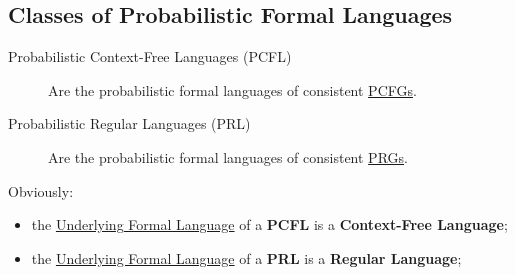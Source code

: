 \subsection{Classes of Probabilistic Formal Languages}\label{sub:lm_classes_of_probabilistic_formal_languages} %
\begin{description}
    \item[Probabilistic Context-Free Languages (PCFL)] Are the probabilistic formal languages of consistent \hyperref[def:pcfg]{PCFGs}.
    \item[Probabilistic Regular Languages (PRL)] Are the probabilistic formal languages of consistent \hyperref[def:prg]{PRGs}.
\end{description}
\begin{remark}{}{}
    Obviously:
    \begin{itemize}
        \item the \hyperref[sub:lm_underlying_formal_language]{Underlying Formal Language} of a \textbf{PCFL} is a \textbf{Context-Free Language};
        \item the \hyperref[sub:lm_underlying_formal_language]{Underlying Formal Language} of a \textbf{PRL} is a \textbf{Regular Language};
    \end{itemize}
\end{remark}
%

